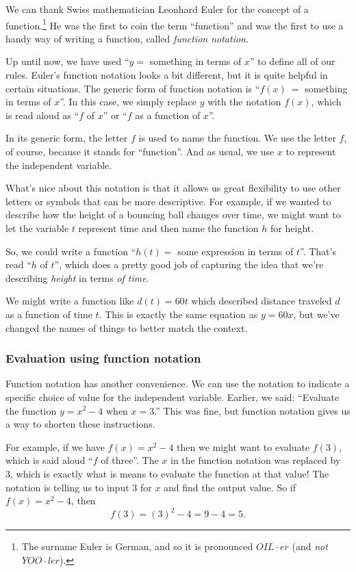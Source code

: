 We can thank Swiss mathematician Leonhard Euler for the concept of a function.\footnote{The surname Euler is German, and so it is pronounced $OIL \cdot er$ (and \textit{not} $YOO \cdot ler$).} He was the first to coin the term ``function'' and was the first to use a handy way of writing a function, called \textit{function notation}.

Up until now, we have used ``$y=$ something in terms of $x$'' to define all of our rules. Euler's function notation looks a bit different, but it is quite helpful in certain situations. The generic form of function notation is ``$f(x)~=$ something in terms of $x$''. In this case, we simply replace $y$ with the notation $f(x)$, which is read aloud as ``$f$ of $x$'' or ``$f$ as a function of $x$''.

In its generic form, the letter $f$ is used to name the function. We use the letter $f$, of course, because it stands for ``function''. And as usual, we use $x$ to represent the independent variable.

What's nice about this notation is that it allows us great flexibility to use other letters or symbols that can be more descriptive. For example, if we wanted to describe how the height of a bouncing ball changes over time, we might want to let the variable $t$ represent time and then name the function $h$ for height.

So, we could write a function ``$h(t) =$ some expression in terms of $t$''. That's read ``$h$ of $t$'', which does a pretty good job of capturing the idea that we're describing \textit{height} in terms \textit{of time}.

We might write a function like $d(t) = 60t$ which described distance traveled $d$ as a function of time $t$. This is exactly the same equation as $y = 60x$, but we've changed the names of things to better match the context.

\subsubsection{Evaluation using function notation}

Function notation has another convenience. We can use the notation to indicate a specific choice of value for the independent variable. Earlier, we said: ``Evaluate the function $y = x^2-4$ when $x = 3$.'' This was fine, but function notation gives us a way to shorten these instructions.

For example, if we have $f(x) = x^2-4$ then we might want to evaluate $f(3)$, which is said aloud ``$f$ of three''. The $x$ in the function notation was replaced by 3, which is exactly what is means to evaluate the function at that value! The notation is telling us to input 3 for $x$ and find the output value. So if $f(x) = x^2 - 4$, then \[f(3) = (3)^2 - 4 = 9 - 4 = 5.\]

